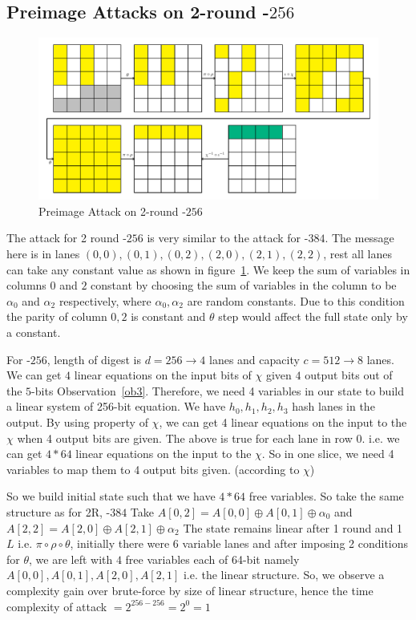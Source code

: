 \subsection{Preimage Attacks on 2-round \KECCAK-$256$}\label{section2RKeccak256}
    \begin{figure}
        \centering
        \includegraphics[scale=0.6]{2Rkeccak256.pdf}
        \caption{Preimage Attack on 2-round \KECCAK-$256$}
        \label{fig:2rkeccak256}
    \end{figure}
	The attack for 2 round \KECCAK-$256$ is very similar to the attack for \KECCAK-$384$.
	The message here is in lanes $(0, 0), (0, 1), (0, 2), (2, 0), (2, 1), (2, 2)$, rest all lanes can take any constant value as shown in figure~\ref{fig:2rkeccak256}. We keep the sum of variables in columns $0$ and $2$ constant by choosing the sum of variables in the column to be $\alpha_0$ and $\alpha_2$ respectively, where $\alpha_0, \alpha_2$ are random constants. Due to this condition the parity of column $0, 2$ is constant and $\theta$ step would affect the full state only by a constant.
	
	For \KECCAK-$256$, length of digest is $d = 256 \rightarrow 4$ lanes and capacity $c = 512 \rightarrow 8$ lanes. We can get $4$ linear equations on the input bits of $\chi$ given $4$ output bits out of the $5$-bits Observation~\ref{ob3}. Therefore, we need 4 variables in our state to build a linear system of 256-bit equation.	We have $h_0, h_1, h_2, h_3$  hash lanes in the output. By using property of $\chi$, we can get 4 linear equations on the input to the $\chi$ when 4 output bits are given. The above is true for each lane in row 0. i.e. we can get $4*64$ linear equations on the input to the $\chi$. So in one slice, we need 4 variables to map them to 4 output bits given. (according to $\chi$) 
	
	So we build initial state such that we have $4*64$ free variables. So take the same structure as for 2R, \KECCAK-$384$
	Take $A[0, 2] = A[0, 0] \oplus A[0, 1] \oplus \alpha_0$
	and $A[2, 2] = A[2, 0] \oplus A[2, 1] \oplus \alpha_2$
	The state remains linear after 1 round and 1 $L$ i.e. $\pi \circ \rho \circ \theta$, initially there were 6 variable lanes and after imposing 2 conditions for $\theta$, we are left with $4$ free variables each of 64-bit namely $A[0,0], A[0,1], A[2, 0], A[2,1]$ i.e. the linear structure.
	So, we observe a complexity gain over brute-force by size of linear structure, hence the time complexity of attack $ = 2^{256 - 256} = 2^{0} = 1$
	
